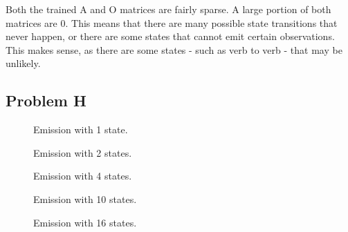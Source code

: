 \documentclass[12pt]{article} %
\begin{document}
Both the trained A and O matrices are fairly sparse. A large portion of both matrices are 0. This means that there are many possible state transitions that never happen, or there are some states that cannot emit certain observations. This makes sense, as there are some states - such as verb to verb - that may be unlikely.

\subsection{Problem H}

\begin{figure}[H]
	\caption{Emission with 1 state.}
\end{figure}

\begin{figure}[H]
	\caption{Emission with 2 states.}
\end{figure}

\begin{figure}[H]
	\caption{Emission with 4 states.}
\end{figure}

\begin{figure}[H]
	\caption{Emission with 10 states.}
\end{figure}

\begin{figure}[H]
	\caption{Emission with 16 states.}
\end{figure}
\end{document}
